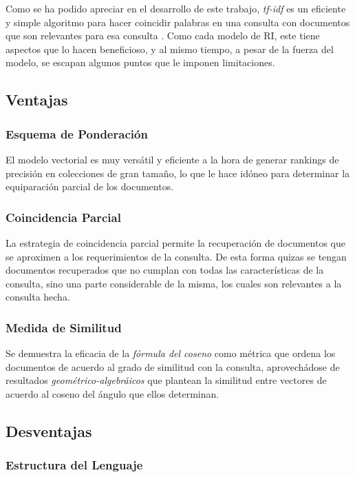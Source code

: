 Como se ha podido apreciar en el desarrollo de este trabajo, \emph{tf-idf} es
un eficiente y simple algoritmo para hacer coincidir palabras en una consulta
con documentos que son relevantes para esa consulta \cite{ramos}. Como cada
modelo de RI, este tiene aspectos que lo hacen beneficioso, y al mismo tiempo,
a pesar de la fuerza del modelo, se escapan algunos puntos que le imponen
limitaciones.

\subsection{Ventajas}

\subsubsection{Esquema de Ponderación}

El modelo vectorial es muy versátil y eficiente a la hora de generar rankings
de precisión en colecciones de gran tamaño, lo que le hace idóneo para
determinar la equiparación parcial de los documentos. 

\subsubsection{Coincidencia Parcial}

La estrategia de coincidencia parcial permite la recuperación de documentos
que se aproximen a los requerimientos de la consulta. De esta forma quizas se
tengan documentos recuperados que no cumplan con todas las características de
la consulta, sino una parte considerable de la misma, los cuales son relevantes
a la consulta hecha.

\subsubsection{Medida de Similitud}

Se demuestra la eficacia de la \emph{fórmula del coseno} como métrica que
ordena los documentos de acuerdo al grado de similitud con la consulta,
aprovechádose de resultados \emph{geométrico-algebráicos} que plantean la
similitud entre vectores de acuerdo al coseno del ángulo que ellos determinan. 

\subsection{Desventajas}

\subsubsection{Estructura del Lenguaje}

